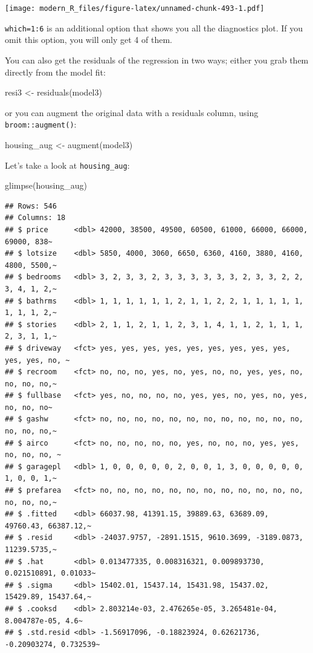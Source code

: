 \documentclass[
]{article}
\newenvironment{Shaded}{\begin{snugshade}}{\end{snugshade}}
\newcommand{\FunctionTok}[1]{\textcolor[rgb]{0.00,0.00,0.00}{#1}}
\newcommand{\NormalTok}[1]{#1}
\newcommand{\OtherTok}[1]{\textcolor[rgb]{0.56,0.35,0.01}{#1}}
\begin{document}
\texttt{[image: modern\_R\_files/figure-latex/unnamed-chunk-493-1.pdf]}

\texttt{which=1:6} is an additional option that shows you all the diagnostics plot. If you omit this
option, you will only get 4 of them.

You can also get the residuals of the regression in two ways; either you grab them directly from
the model fit:

\begin{Shaded}
\begin{Highlighting}[]
\NormalTok{resi3 }\OtherTok{\textless{}{-}} \FunctionTok{residuals}\NormalTok{(model3)}
\end{Highlighting}
\end{Shaded}

or you can augment the original data with a residuals column, using \texttt{broom::augment()}:

\begin{Shaded}
\begin{Highlighting}[]
\NormalTok{housing\_aug }\OtherTok{\textless{}{-}} \FunctionTok{augment}\NormalTok{(model3)}
\end{Highlighting}
\end{Shaded}

Let's take a look at \texttt{housing\_aug}:

\begin{Shaded}
\begin{Highlighting}[]
\FunctionTok{glimpse}\NormalTok{(housing\_aug)}
\end{Highlighting}
\end{Shaded}

\begin{verbatim}
## Rows: 546
## Columns: 18
## $ price      <dbl> 42000, 38500, 49500, 60500, 61000, 66000, 66000, 69000, 838~
## $ lotsize    <dbl> 5850, 4000, 3060, 6650, 6360, 4160, 3880, 4160, 4800, 5500,~
## $ bedrooms   <dbl> 3, 2, 3, 3, 2, 3, 3, 3, 3, 3, 3, 2, 3, 3, 2, 2, 3, 4, 1, 2,~
## $ bathrms    <dbl> 1, 1, 1, 1, 1, 1, 2, 1, 1, 2, 2, 1, 1, 1, 1, 1, 1, 1, 1, 2,~
## $ stories    <dbl> 2, 1, 1, 2, 1, 1, 2, 3, 1, 4, 1, 1, 2, 1, 1, 1, 2, 3, 1, 1,~
## $ driveway   <fct> yes, yes, yes, yes, yes, yes, yes, yes, yes, yes, yes, no, ~
## $ recroom    <fct> no, no, no, yes, no, yes, no, no, yes, yes, no, no, no, no,~
## $ fullbase   <fct> yes, no, no, no, no, yes, yes, no, yes, no, yes, no, no, no~
## $ gashw      <fct> no, no, no, no, no, no, no, no, no, no, no, no, no, no, no,~
## $ airco      <fct> no, no, no, no, no, yes, no, no, no, yes, yes, no, no, no, ~
## $ garagepl   <dbl> 1, 0, 0, 0, 0, 0, 2, 0, 0, 1, 3, 0, 0, 0, 0, 0, 1, 0, 0, 1,~
## $ prefarea   <fct> no, no, no, no, no, no, no, no, no, no, no, no, no, no, no,~
## $ .fitted    <dbl> 66037.98, 41391.15, 39889.63, 63689.09, 49760.43, 66387.12,~
## $ .resid     <dbl> -24037.9757, -2891.1515, 9610.3699, -3189.0873, 11239.5735,~
## $ .hat       <dbl> 0.013477335, 0.008316321, 0.009893730, 0.021510891, 0.01033~
## $ .sigma     <dbl> 15402.01, 15437.14, 15431.98, 15437.02, 15429.89, 15437.64,~
## $ .cooksd    <dbl> 2.803214e-03, 2.476265e-05, 3.265481e-04, 8.004787e-05, 4.6~
## $ .std.resid <dbl> -1.56917096, -0.18823924, 0.62621736, -0.20903274, 0.732539~
\end{verbatim}
\end{document}
